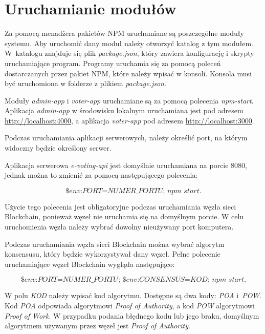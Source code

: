 \documentclass[a4paper,12pt]{book}
\begin{document}
\section{Uruchamianie modułów}
 
Za pomocą menadżera pakietów NPM uruchamiane są poszczególne moduły systemu. Aby uruchomić dany moduł należy otworzyć katalog z tym modułem. W~katalogu znajduje się plik \textit{package.json}, który zawiera konfigurację i skrypty uruchamiające program. Programy uruchamia się za pomocą poleceń dostarczanych przez pakiet NPM, które należy wpisać w konsoli. Konsola musi być uruchomiona w folderze z plikiem \textit{package.json}.
 
Moduły \textit{admin-app} i \textit{voter-app} uruchamiane są za pomocą polecenia \textit{npm-start}. Aplikacja \textit{admin-app} w środowisku lokalnym uruchamiana jest pod adresem \url{http://localhost:4000}, a aplikacja \textit{voter-app} pod adresem \url{http://localhost:3000}.
 
Podczas uruchamiania aplikacji serwerowych, należy określić port, na którym widoczny będzie określony serwer.
 
Aplikacja serwerowa \textit{e-voting-api} jest domyślnie uruchamiana na porcie 8080, jednak można to zmienić za pomocą następującego polecenia:
 
\begin{equation}
	\textit{\$env:PORT=NUMER\_PORTU; npm start}.
\end{equation}

Użycie tego polecenia jest obligatoryjne podczas uruchamiania węzła sieci Blockchain, ponieważ węzeł nie uruchamia się na domyślnym porcie. W celu uruchomienia węzła należy wybrać dowolny nieużywany port komputera.
 
Podczas uruchamiania węzła sieci Blockchain można wybrać algorytm konsensusu, który będzie wykorzystywał dany węzeł. Pełne polecenie uruchamiające węzeł Blockchain wygląda następująco:

\begin{equation}
	\textit{\$env:PORT=NUMER\_PORTU; \$env:CONSENSUS=KOD; npm start}.
\end{equation}

W polu \textit{KOD} należy wpisać kod algorytmu. Dostępne są dwa kody: \textit{POA} i~\textit{POW}. Kod \textit{POA} odpowiada algorytmowi \textit{Proof of Authority}, a kod \textit{POW} algorytmowi \textit{Proof of Work}. W przypadku podania błędnego kodu lub jego braku, domyślnym algorytmem używanym przez węzeł jest \textit{Proof of Authority}.
\end{document}
